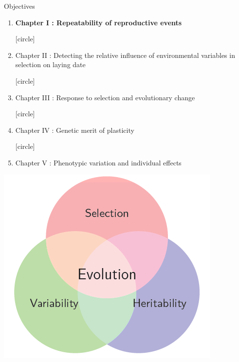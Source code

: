 \documentclass[compress]{beamer}
\begin{document}
\begin{frame}{Objectives}
   \begin{enumerate}
  [circle]
\item \normalsize \textbf{Chapter I : Repeatability of reproductive events}
\vspace{0.3cm}

  [circle]
\item \normalsize Chapter II : Detecting the relative influence of environmental variables in selection on laying date  
\vspace{0.3cm}

  [circle]
\item \normalsize Chapter III : Response to selection and evolutionary change
\vspace{0.3cm}

  [circle]
\item \normalsize Chapter IV : Genetic merit of plasticity 
\vspace{0.3cm}

  [circle]
\item \normalsize Chapter V : Phenotypic variation and individual effects
\end{enumerate}

\vspace{0.5cm}
\centering
  \includegraphics[height = 3.5 cm]{Image/evolution.png} 

\end{frame}
\end{document}
